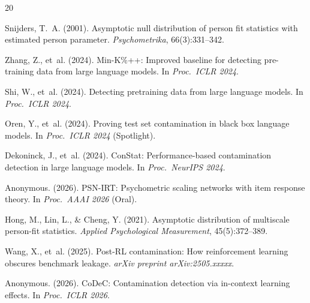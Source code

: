 \documentclass[11pt,a4paper]{article}
\begin{document}

\begin{thebibliography}{20}

Snijders, T.~A. (2001).
\newblock Asymptotic null distribution of person fit statistics with estimated person parameter.
\newblock \textit{Psychometrika}, 66(3):331--342.

Zhang, Z., et~al. (2024).
\newblock Min-K\%++: Improved baseline for detecting pre-training data from large language models.
\newblock In \textit{Proc.\ ICLR 2024}.

Shi, W., et~al. (2024).
\newblock Detecting pretraining data from large language models.
\newblock In \textit{Proc.\ ICLR 2024}.

Oren, Y., et~al. (2024).
\newblock Proving test set contamination in black box language models.
\newblock In \textit{Proc.\ ICLR 2024} (Spotlight).

Dekoninck, J., et~al. (2024).
\newblock ConStat: Performance-based contamination detection in large language models.
\newblock In \textit{Proc.\ NeurIPS 2024}.

Anonymous. (2026).
\newblock PSN-IRT: Psychometric scaling networks with item response theory.
\newblock In \textit{Proc.\ AAAI 2026} (Oral).

Hong, M., Lin, L., \& Cheng, Y. (2021).
\newblock Asymptotic distribution of multiscale person-fit statistics.
\newblock \textit{Applied Psychological Measurement}, 45(5):372--389.

Wang, X., et~al. (2025).
\newblock Post-RL contamination: How reinforcement learning obscures benchmark leakage.
\newblock \textit{arXiv preprint arXiv:2505.xxxxx}.

Anonymous. (2026).
\newblock CoDeC: Contamination detection via in-context learning effects.
\newblock In \textit{Proc.\ ICLR 2026}.

\end{thebibliography}
\end{document}
